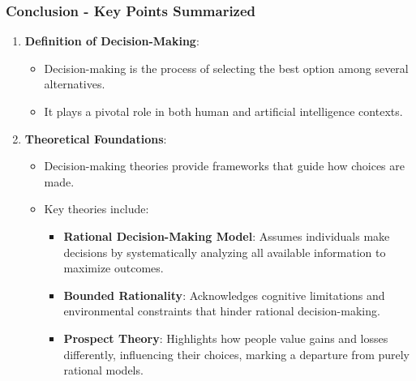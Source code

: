 \documentclass[aspectratio=169]{beamer}
\begin{document}
\begin{frame}[fragile]
    \frametitle{Conclusion - Key Points Summarized}
    
    \begin{enumerate}
        \item \textbf{Definition of Decision-Making}:
            \begin{itemize}
                \item Decision-making is the process of selecting the best option among several alternatives.
                \item It plays a pivotal role in both human and artificial intelligence contexts.
            \end{itemize}
        
        \item \textbf{Theoretical Foundations}:
            \begin{itemize}
                \item Decision-making theories provide frameworks that guide how choices are made.
                \item Key theories include:
                    \begin{itemize}
                        \item \textbf{Rational Decision-Making Model}: Assumes individuals make decisions by systematically analyzing all available information to maximize outcomes.
                        \item \textbf{Bounded Rationality}: Acknowledges cognitive limitations and environmental constraints that hinder rational decision-making.
                        \item \textbf{Prospect Theory}: Highlights how people value gains and losses differently, influencing their choices, marking a departure from purely rational models.
                    \end{itemize}
            \end{itemize}
    \end{enumerate}
    
\end{frame}
\end{document}
